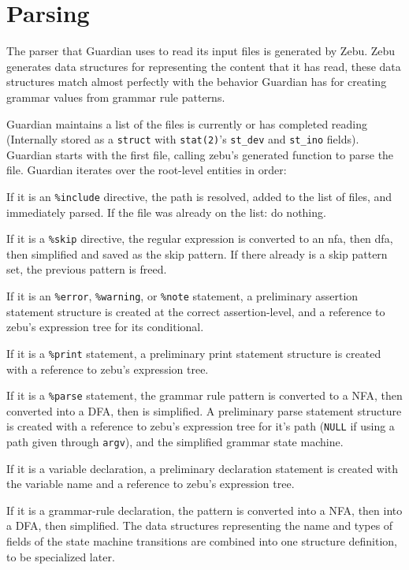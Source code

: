 
\section{Parsing}
{
	The parser that Guardian uses to read its input files is generated by Zebu.
	Zebu generates data structures for representing the content that it has
	read, these data structures match almost perfectly with the behavior
	Guardian has for creating grammar values from grammar rule patterns.
	
	Guardian maintains a list of the files is currently or has completed
	reading (Internally stored as a \texttt{struct} with \texttt{stat(2)}'s
	\texttt{st\_dev} and \texttt{st\_ino} fields).
	Guardian starts with the first file,
	calling zebu's generated function to parse the
	file.
	Guardian iterates over the root-level entities in
	order:
	\begin{itemize}
	{
		\item If it is an \texttt{\%include} directive, the path is resolved,
		added to the list of files, and immediately parsed. If the file
		was already on the list: do nothing.
		
		\item If it is a \texttt{\%skip} directive, the regular expression
		is converted to an nfa, then dfa, then simplified and saved as the
		skip pattern. If there already is a skip pattern set, the previous
		pattern is freed.
		
		\item If it is an \texttt{\%error}, \texttt{\%warning},
			or \texttt{\%note} statement, a preliminary assertion statement
			structure
			is created at the correct assertion-level, and a reference
			to zebu's expression tree for its conditional.
		
		\item If it is a \texttt{\%print} statement, a preliminary print
			statement structure is created with a reference to
			zebu's expression tree.
		
		\item If it is a \texttt{\%parse} statement, the grammar rule pattern
			is converted to a NFA, then converted
			into a DFA, then is simplified. A preliminary
			parse statement structure is created with a reference to
			zebu's expression tree for it's path (\texttt{NULL} if using
			a path given through \texttt{argv}), and the simplified grammar
			state machine.
		
		\item If it is a variable declaration, a preliminary
			declaration statement is created with the variable name and a
			reference to zebu's expression tree.
		
		\item If it is a grammar-rule declaration, the pattern is converted
			into a NFA, then into a DFA, then simplified.
			The data structures representing the name and types of fields
			of the state machine transitions are combined into one structure
			definition, to be specialized later.
	}
	\end{itemize}
}




















